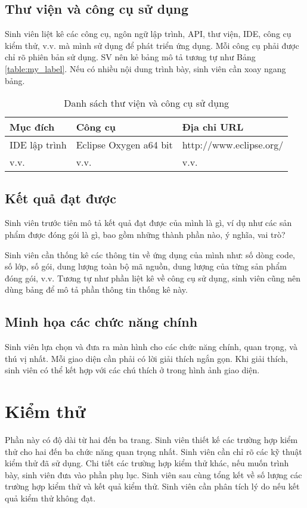 \documentclass[../DoAn.tex]{subfiles}
\begin{document}
\subsection{Thư viện và công cụ sử dụng}
Sinh viên liệt kê các công cụ, ngôn ngữ lập trình, API, thư viện, IDE, công cụ kiểm thử, v.v. mà mình sử dụng để phát triển ứng dụng. Mỗi công cụ phải được chỉ rõ phiên bản sử dụng. SV nên kẻ bảng mô tả tương tự như Bảng \ref{table:my_label}. Nếu có nhiều nội dung trình bày, sinh viên cần xoay ngang bảng.

\begin{table}[H]
\centering{}
    \begin{tabular}{lll}
        \hline
        \textbf{Mục đích} & \textbf{Công cụ}       & \textbf{Địa chỉ URL}    \\ \hline
        IDE lập trình     & Eclipse Oxygen a64 bit & http://www.eclipse.org/ \\ \hline
        v.v.              & v.v.                   & v.v.                    \\ \hline
        \end{tabular}
    \caption{Danh sách thư viện và công cụ sử dụng}
    \label{fig:my_label}
\end{table}

\subsection{Kết quả đạt được}
Sinh viên trước tiên mô tả kết quả đạt được của mình là gì, ví dụ như các sản phẩm được đóng gói là gì, bao gồm những thành phần nào, ý nghĩa, vai trò?

Sinh viên cần thống kê các thông tin về ứng dụng của mình như: số dòng code, số lớp, số gói, dung lượng toàn bộ mã nguồn, dung lượng của từng sản phẩm đóng gói, v.v. Tương tự như phần liệt kê về công cụ sử dụng, sinh viên cũng nên dùng bảng để mô tả phần thông tin thống kê này.

\subsection{Minh họa các chức năng chính}
Sinh viên lựa chọn và đưa ra màn hình cho các chức năng chính, quan trọng, và thú vị nhất. Mỗi giao diện cần phải có lời giải thích ngắn gọn. Khi giải thích, sinh viên có thể kết hợp với các chú thích ở trong hình ảnh giao diện.

\section{Kiểm thử}
Phần này có độ dài từ hai đến ba trang. Sinh viên thiết kế các trường hợp kiểm thử cho hai đến ba chức năng quan trọng nhất. Sinh viên cần chỉ rõ các kỹ thuật kiểm thử đã sử dụng. Chi tiết các trường hợp kiểm thử khác, nếu muốn trình bày, sinh viên đưa vào phần phụ lục.
Sinh viên sau cùng tổng kết về số lượng các trường hợp kiểm thử và kết quả kiểm thử. Sinh viên cần phân tích lý do nếu kết quả kiểm thử không đạt.
\end{document}
